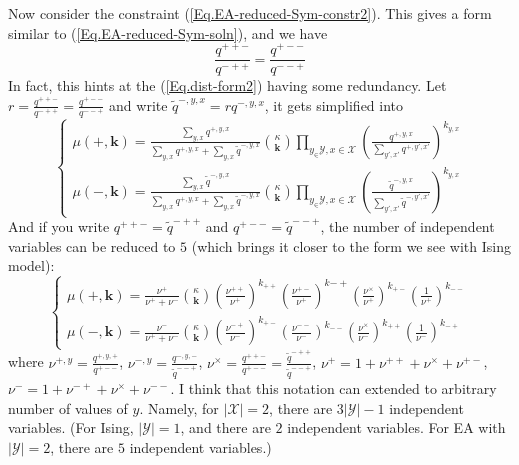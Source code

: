 \documentclass[12pt]{article}
\numberwithin{equation}{section}
\begin{document}
Now consider the constraint (\ref{Eq.EA-reduced-Sym-constr2}). This gives a form similar to (\ref{Eq.EA-reduced-Sym-soln}), and we have
\begin{equation}
    \frac{q^{++-}}{q^{-++}}=\frac{q^{+--}}{q^{--+}}
\end{equation}
In fact, this hints at the (\ref{Eq.dist-form2}) having some redundancy. Let $r=\frac{q^{++-}}{q^{-++}}=\frac{q^{+--}}{q^{--+}}$
and write $\tilde{q}^{-,y,x}=rq^{-,y,x}$, it gets simplified into
\begin{equation}
    \begin{cases}
        \mu(+, \mathbf{k}) = \displaystyle{\frac{\sum_{y, x}q^{+,y,x}}{\sum_{y, x}q^{+,y,x} + \sum_{y, x}\tilde{q}^{-,y,x}}{\kappa\choose\mathbf{k}} \prod_{y_\in\mathcal{Y}, x\in\mathcal{X}}\left(\frac{q^{+,y,x}}{\sum_{y', x'}q^{+,y',x'}}\right)^{k_{y,x}}} \\
        \mu(-, \mathbf{k}) = \displaystyle{\frac{\sum_{y, x}\tilde{q}^{-,y,x}}{\sum_{y, x}q^{+,y,x} + \sum_{y, x}\tilde{q}^{-,y,x}}{\kappa\choose\mathbf{k}} \prod_{y_\in\mathcal{Y}, x\in\mathcal{X}}\left(\frac{\tilde{q}^{-,y,x}}{\sum_{y', x'}\tilde{q}^{-,y',x'}}\right)^{k_{y,x}}}
    \end{cases}
\end{equation}
And if you write $q^{++-} = \tilde{q}^{-++}$ and $q^{+--} = \tilde{q}^{--+}$, the number of independent variables can be reduced to $5$ (which brings it closer to the form we see with Ising model):
\begin{equation}
    \begin{cases}
        \mu(+, \mathbf{k}) = \displaystyle{\frac{\nu^+}{\nu^+ + \nu^-}{\kappa\choose\mathbf{k}} \left(\frac{\nu^{++}}{\nu^+}\right)^{k_{++}}\left(\frac{\nu^{+-}}{\nu^+}\right)^{k{-+}}\left(\frac{\nu^{\times}}{\nu^+}\right)^{k_{+-}}\left(\frac{1}{\nu^+}\right)^{k_{--}}} \\
        \mu(-, \mathbf{k}) = \displaystyle{\frac{\nu^-}{\nu^+ + \nu^-}{\kappa\choose\mathbf{k}} \left(\frac{\nu^{-+}}{\nu^-}\right)^{k_{+-}}\left(\frac{\nu^{--}}{\nu^-}\right)^{k_{--}}\left(\frac{\nu^{\times}}{\nu^-}\right)^{k_{++}}\left(\frac{1}{\nu^-}\right)^{k_{-+}}}
    \end{cases}
\end{equation}
where $\nu^{+, y} = \frac{q^{+, y, +}}{q^{+--}}$, $\nu^{-, y} = \frac{q^{-, y, -}}{\tilde{q}^{--+}}$, $\nu^{\times} = \frac{q^{++-}}{q^{+--}} = \frac{\tilde{q}^{-++}}{\tilde{q}^{--+}}$, $\nu^+=1+\nu^{++}+\nu^\times+\nu^{+-}$, $\nu^-=1+\nu^{-+}+\nu^\times+\nu^{--}$. I think that this notation
can extended to arbitrary number of values of $y$. Namely, for $|\mathcal{X}|=2$, there are $3|\mathcal{Y}| - 1$ independent variables. (For Ising,
$|\mathcal{Y}|=1$, and there are $2$ independent variables. For EA with $|\mathcal{Y}|=2$, there are $5$ independent variables.)
\end{document}
